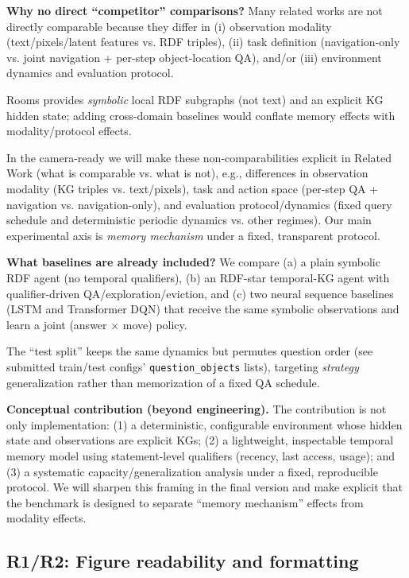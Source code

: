 \documentclass[runningheads]{llncs}
\begin{document}
\textbf{Why no direct “competitor” comparisons?} Many related works are not directly comparable because they differ in (i) observation modality (text/pixels/latent features vs. RDF triples), (ii) task definition (navigation-only vs. joint navigation + per-step object-location QA), and/or (iii) environment dynamics and evaluation protocol.

Rooms provides \emph{symbolic} local RDF subgraphs (not text) and an explicit KG hidden state; adding cross-domain baselines would conflate memory effects with modality/protocol effects.

In the camera-ready we will make these non-comparabilities explicit in Related Work (what is comparable vs. what is not), e.g., differences in observation modality (KG triples vs. text/pixels), task and action space (per-step QA + navigation vs. navigation-only), and evaluation protocol/dynamics (fixed query schedule and deterministic periodic dynamics vs. other regimes). Our main experimental axis is \emph{memory mechanism} under a fixed, transparent protocol.

\textbf{What baselines are already included?} We compare (a) a plain symbolic RDF agent (no temporal qualifiers), (b) an RDF-star temporal-KG agent with qualifier-driven QA/exploration/eviction, and (c) two neural sequence baselines (LSTM and Transformer DQN) that receive the same symbolic observations and learn a joint (answer $\times$ move) policy.

The “test split” keeps the same dynamics but permutes question order (see submitted train/test configs’ \texttt{question\_objects} lists), targeting \emph{strategy} generalization rather than memorization of a fixed QA schedule.

\textbf{Conceptual contribution (beyond engineering).} The contribution is not only implementation: (1) a deterministic, configurable environment whose hidden state and observations are explicit KGs; (2) a lightweight, inspectable temporal memory model using statement-level qualifiers (recency, last access, usage); and (3) a systematic capacity/generalization analysis under a fixed, reproducible protocol. We will sharpen this framing in the final version and make explicit that the benchmark is designed to separate “memory mechanism” effects from modality effects.

\subsection*{R1/R2: Figure readability and formatting}
\end{document}
